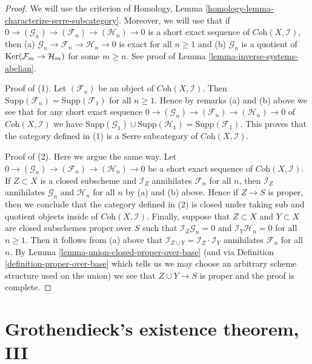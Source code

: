 \begin{proof}
We will use the criterion of
Homology, Lemma \ref{homology-lemma-characterize-serre-subcategory}.
Moreover, we will use that if
$0 \to (\mathcal{G}_n) \to (\mathcal{F}_n) \to (\mathcal{H}_n) \to 0$
is a short exact sequence of $\textit{Coh}(X, \mathcal{I})$, then
(a) $\mathcal{G}_n \to \mathcal{F}_n \to \mathcal{H}_n \to 0$
is exact for all $n \geq 1$ and
(b) $\mathcal{G}_n$ is a quotient of $\mathop{\mathrm{Ker}}(\mathcal{F}_m \to \mathcal{H}_m)$
for some $m \geq n$. See proof of Lemma \ref{lemma-inverse-systems-abelian}.

\medskip\noindent
Proof of (1). Let $(\mathcal{F}_n)$ be an object of
$\textit{Coh}(X, \mathcal{I})$. Then
$\text{Supp}(\mathcal{F}_n) = \text{Supp}(\mathcal{F}_1)$ for all $n \geq 1$.
Hence by remarks (a) and (b) above we see that
for any short exact sequence
$0 \to (\mathcal{G}_n) \to (\mathcal{F}_n) \to (\mathcal{H}_n) \to 0$
of $\textit{Coh}(X, \mathcal{I})$ we have
$\text{Supp}(\mathcal{G}_1) \cup \text{Supp}(\mathcal{H}_1) =
\text{Supp}(\mathcal{F}_1)$.
This proves that the category defined in (1)
is a Serre subcategory of $\textit{Coh}(X, \mathcal{I})$.

\medskip\noindent
Proof of (2). Here we argue the same way. Let
$0 \to (\mathcal{G}_n) \to (\mathcal{F}_n) \to (\mathcal{H}_n) \to 0$
be a short exact sequence of $\textit{Coh}(X, \mathcal{I})$.
If $Z \subset X$ is a closed subscheme and $\mathcal{I}_Z$
annihilates $\mathcal{F}_n$ for all $n$, then
$\mathcal{I}_Z$ annihilates $\mathcal{G}_n$ and $\mathcal{H}_n$
for all $n$ by (a) and (b) above.
Hence if $Z \to S$ is proper, then we conclude that the category
defined in (2) is closed under taking sub and quotient objects
inside of $\textit{Coh}(X, \mathcal{I})$.
Finally, suppose that $Z \subset X$ and $Y \subset X$ are
closed subschemes proper over $S$ such that
$\mathcal{I}_Z \mathcal{G}_n = 0$ and
$\mathcal{I}_Y \mathcal{H}_n = 0$ for all $n \geq 1$.
Then it follows from (a) above that
$\mathcal{I}_{Z \cup Y} = \mathcal{I}_Z \cdot \mathcal{I}_Y$
annihilates $\mathcal{F}_n$ for all $n$.
By Lemma \ref{lemma-union-closed-proper-over-base}
(and via Definition \ref{definition-proper-over-base} which
tells us we may choose an arbitrary scheme structure used on the union)
we see that $Z \cup Y \to S$ is proper and the proof is complete.
\end{proof}








\section{Grothendieck's existence theorem, III}
\label{section-existence-proper-support}

